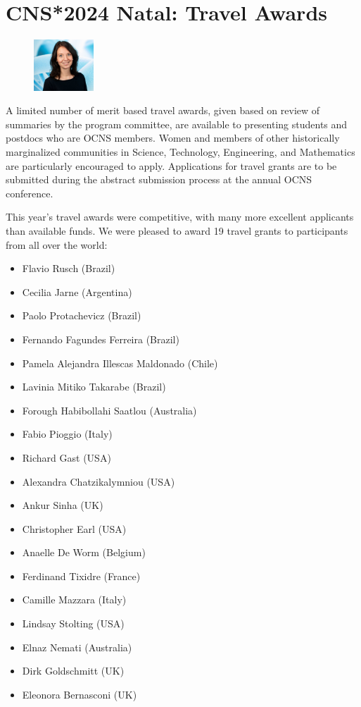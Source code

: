 \section*{CNS*2024 Natal: Travel Awards}%
\begin{figure}
  \includegraphics[width=0.2\textwidth]{images/Moerel}
\end{figure}

\noindent{}A limited number of merit based travel awards, given based on review of summaries by the program committee, are available to presenting students and postdocs who are OCNS members. Women and members of other historically marginalized communities in Science, Technology, Engineering, and Mathematics are particularly encouraged to apply.
Applications for travel grants are to be submitted during the abstract submission process at the annual OCNS conference.

This year's travel awards were competitive, with many more excellent applicants than available funds.
We were pleased to award 19 travel grants to participants from all over the world:

\begin{multicols}{2}
    \begin{itemize}
      \item Flavio Rusch (Brazil)
      \item Cecilia Jarne (Argentina)
      \item Paolo Protachevicz (Brazil)
      \item Fernando Fagundes Ferreira (Brazil)
      \item Pamela Alejandra Illescas Maldonado (Chile)
      \item Lavinia Mitiko Takarabe (Brazil)
      \item Forough Habibollahi Saatlou (Australia)
      \item Fabio Pioggio (Italy)
      \item Richard Gast (USA)
      \item Alexandra Chatzikalymniou (USA)
      \item Ankur Sinha (UK)
      \item Christopher Earl (USA)
      \item Anaelle De Worm (Belgium)
      \item Ferdinand Tixidre (France)
      \item Camille Mazzara (Italy)
      \item Lindsay Stolting (USA)
      \item Elnaz Nemati (Australia)
      \item Dirk Goldschmitt (UK)
      \item Eleonora Bernasconi (UK)
    \end{itemize}
\end{multicols}
\vspace{2ex}
\clearpage
